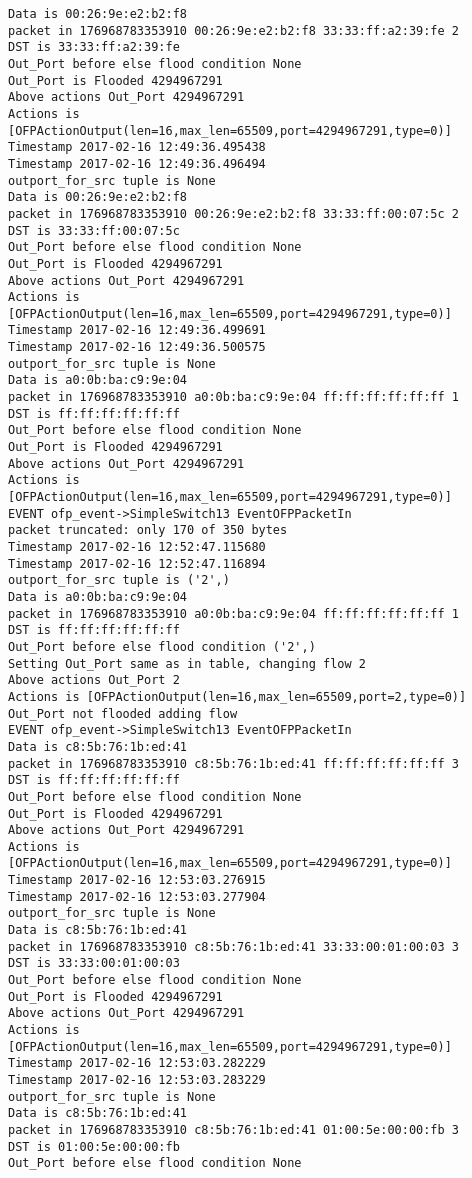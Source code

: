 \begin{lstlisting}[frame=single, caption={The RYU Verbose log}, label={lst:RYUverboselog}]
Data is 00:26:9e:e2:b2:f8
packet in 176968783353910 00:26:9e:e2:b2:f8 33:33:ff:a2:39:fe 2
DST is 33:33:ff:a2:39:fe
Out_Port before else flood condition None
Out_Port is Flooded 4294967291
Above actions Out_Port 4294967291
Actions is [OFPActionOutput(len=16,max_len=65509,port=4294967291,type=0)]
Timestamp 2017-02-16 12:49:36.495438
Timestamp 2017-02-16 12:49:36.496494
outport_for_src tuple is None
Data is 00:26:9e:e2:b2:f8
packet in 176968783353910 00:26:9e:e2:b2:f8 33:33:ff:00:07:5c 2
DST is 33:33:ff:00:07:5c
Out_Port before else flood condition None
Out_Port is Flooded 4294967291
Above actions Out_Port 4294967291
Actions is [OFPActionOutput(len=16,max_len=65509,port=4294967291,type=0)]
Timestamp 2017-02-16 12:49:36.499691
Timestamp 2017-02-16 12:49:36.500575
outport_for_src tuple is None
Data is a0:0b:ba:c9:9e:04
packet in 176968783353910 a0:0b:ba:c9:9e:04 ff:ff:ff:ff:ff:ff 1
DST is ff:ff:ff:ff:ff:ff
Out_Port before else flood condition None
Out_Port is Flooded 4294967291
Above actions Out_Port 4294967291
Actions is [OFPActionOutput(len=16,max_len=65509,port=4294967291,type=0)]
EVENT ofp_event->SimpleSwitch13 EventOFPPacketIn
packet truncated: only 170 of 350 bytes
Timestamp 2017-02-16 12:52:47.115680
Timestamp 2017-02-16 12:52:47.116894
outport_for_src tuple is ('2',)
Data is a0:0b:ba:c9:9e:04
packet in 176968783353910 a0:0b:ba:c9:9e:04 ff:ff:ff:ff:ff:ff 1
DST is ff:ff:ff:ff:ff:ff
Out_Port before else flood condition ('2',)
Setting Out_Port same as in table, changing flow 2
Above actions Out_Port 2
Actions is [OFPActionOutput(len=16,max_len=65509,port=2,type=0)]
Out_Port not flooded adding flow 
EVENT ofp_event->SimpleSwitch13 EventOFPPacketIn
Data is c8:5b:76:1b:ed:41
packet in 176968783353910 c8:5b:76:1b:ed:41 ff:ff:ff:ff:ff:ff 3
DST is ff:ff:ff:ff:ff:ff
Out_Port before else flood condition None
Out_Port is Flooded 4294967291
Above actions Out_Port 4294967291
Actions is [OFPActionOutput(len=16,max_len=65509,port=4294967291,type=0)]
Timestamp 2017-02-16 12:53:03.276915
Timestamp 2017-02-16 12:53:03.277904
outport_for_src tuple is None
Data is c8:5b:76:1b:ed:41
packet in 176968783353910 c8:5b:76:1b:ed:41 33:33:00:01:00:03 3
DST is 33:33:00:01:00:03
Out_Port before else flood condition None
Out_Port is Flooded 4294967291
Above actions Out_Port 4294967291
Actions is [OFPActionOutput(len=16,max_len=65509,port=4294967291,type=0)]
Timestamp 2017-02-16 12:53:03.282229
Timestamp 2017-02-16 12:53:03.283229
outport_for_src tuple is None
Data is c8:5b:76:1b:ed:41
packet in 176968783353910 c8:5b:76:1b:ed:41 01:00:5e:00:00:fb 3
DST is 01:00:5e:00:00:fb
Out_Port before else flood condition None

\end{lstlisting}
